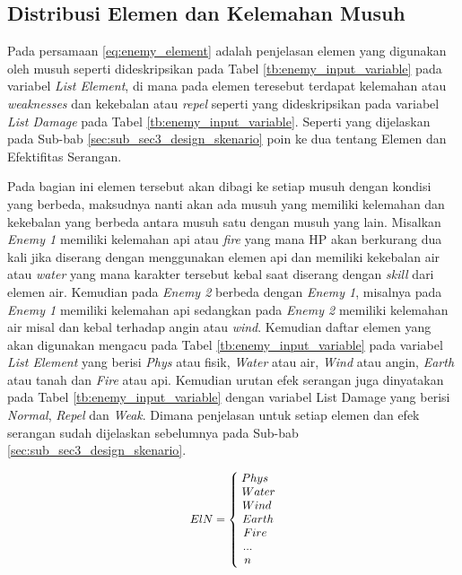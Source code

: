 \subsection{Distribusi Elemen dan Kelemahan Musuh}
\label{sec:sub_sec3_enemy_weak}
\vspace{1ex}

Pada persamaan \ref{eq:enemy_element} adalah penjelasan elemen yang digunakan oleh musuh seperti dideskripsikan pada Tabel \ref{tb:enemy_input_variable} pada variabel \textit{List Element}, di mana pada elemen teresebut terdapat kelemahan atau \textit{weaknesses} dan kekebalan atau \textit{repel} seperti yang dideskripsikan pada variabel \textit{List Damage} pada Tabel \ref{tb:enemy_input_variable}.  Seperti yang dijelaskan pada Sub-bab \ref{sec:sub_sec3_design_skenario} poin ke dua tentang Elemen dan Efektifitas Serangan. 
\vspace{1ex}

Pada bagian ini elemen tersebut akan dibagi ke setiap musuh dengan kondisi yang berbeda, maksudnya nanti akan ada musuh yang memiliki kelemahan dan kekebalan yang berbeda antara musuh satu dengan musuh yang lain. Misalkan \textit{Enemy 1} memiliki kelemahan api atau \textit{fire} yang mana HP akan berkurang dua kali jika diserang dengan menggunakan elemen api dan memiliki kekebalan air atau \textit{water} yang mana karakter tersebut kebal saat diserang dengan \textit{skill} dari elemen air. Kemudian pada \textit{Enemy 2} berbeda dengan \textit{Enemy 1}, misalnya pada \textit{Enemy 1} memiliki kelemahan api sedangkan pada \textit{Enemy 2} memiliki kelemahan air misal dan kebal terhadap angin atau \textit{wind}. Kemudian daftar elemen yang akan digunakan mengacu pada Tabel \ref{tb:enemy_input_variable} pada variabel \textit{List Element} yang berisi \textit{Phys} atau fisik, \textit{Water} atau air, \textit{Wind} atau angin, \textit{Earth} atau tanah dan \textit{Fire} atau api. Kemudian urutan efek serangan juga dinyatakan pada Tabel \ref{tb:enemy_input_variable} dengan variabel List Damage yang berisi \textit{Normal}, \textit{Repel} dan \textit{Weak}. Dimana penjelasan untuk setiap elemen dan efek serangan sudah dijelaskan sebelumnya pada Sub-bab \ref{sec:sub_sec3_design_skenario}.
\vspace{1ex}

\begin{equation}\label{eq:enemy_element}
\resizebox{0.2\textwidth}{!}{%
	$ElN = \left\{\begin{matrix}
	\hspace{-0.34em} Phys \\ 
	\hspace{0.3em} Water \\
	\hspace{0.0em} Wind \\
	\hspace{0.2em} Earth \\
	\hspace{-0.3em} Fire \\
	\hspace{-1.6em} ... \\
	\hspace{-1.6em} n
	\end{matrix}\right.$%
}
\end{equation}

